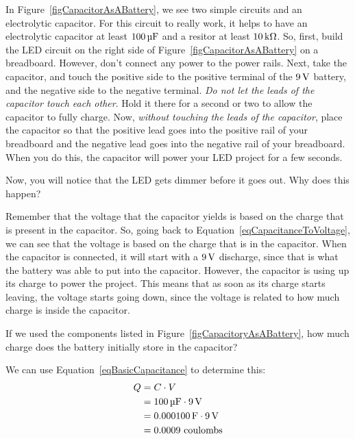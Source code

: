 
In Figure~\ref{figCapacitorAsABattery}, we see two simple circuits and an electrolytic capacitor.
For this circuit to really work, it helps to have an electrolytic capacitor at least $100\,\si{\micro\farad}$ and a resitor at least $10\,\si{\kilo\ohm}$.
So, first, build the LED circuit on the right side of Figure~\ref{figCapacitorAsABattery} on a breadboard.
However, don't connect any power to the power rails.
Next, take the capacitor, and touch the positive side to the positive terminal of the $9\,\si{\volt}$ battery, and the negative side to the negative terminal.
\emph{Do not let the leads of the capacitor touch each other}.
Hold it there for a second or two to allow the capacitor to fully charge.
Now, \emph{without touching the leads of the capacitor}, place the capacitor so that the positive lead goes into the positive rail of your breadboard and the negative lead goes into the negative rail of your breadboard.
When you do this, the capacitor will power your LED project for a few seconds.

Now, you will notice that the LED gets dimmer before it goes out.  
Why does this happen?

Remember that the voltage that the capacitor yields is based on the charge that is present in the capacitor.
So, going back to Equation~\ref{eqCapacitanceToVoltage}, we can see that the voltage is based on the charge that is in the capacitor.
When the capacitor is connected, it will start with a $9\,\si{\volt}$ discharge, since that is what the battery was able to put into the capacitor.
However, the capacitor is using up its charge to power the project.
This means that as soon as its charge starts leaving, the voltage starts going down, since the voltage is related to how much charge is inside the capacitor.

\begin{exampleprob}
If we used the components listed in Figure~\ref{figCapacitoryAsABattery}, how much charge does the battery initially store in the capacitor?

We can use Equation~\ref{eqBasicCapacitance} to determine this:
\begin{align*}
Q &= C\cdot V \\
  &= 100\,\si{\micro\farad}\cdot 9\,\si{\volt} \\
  &= 0.000100\,\si{\farad}\cdot 9\,\si{\volt} \\
  &= 0.0009 \textrm{ coulombs}
\end{align*}
\end{exampleprob}

